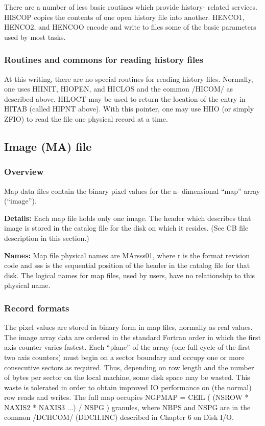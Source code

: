       There are a number of less basic routines which provide history-
related services.  HISCOP copies the contents of one open history file
into another.  HENCO1, HENCO2, and HENCOO encode and write to files
some of the basic parameters used by most tasks.


\subsubsection{Routines and commons for reading history files}


     At this writing, there are no special routines for reading history
files.  Normally, one uses HIINIT, HIOPEN, and HICLOS and the common
/HICOM/ as described above.  HILOCT may be used to return the location
of the entry in HITAB (called HIPNT above).  With this pointer, one may
use HIIO (or simply ZFIO) to read the file one physical record at a
time.

\subsection{Image (MA) file}
\subsubsection{Overview}

 Map data files contain the binary pixel values for the n-
dimensional ``map'' array (``image'').

{\bf Details:} Each map file holds only one image.  The header which
describes that image is stored in the catalog file for the disk on
which it resides.  (See CB file description in this section.)

{\bf Names:} Map file physical names are MArsss01, where r is the
format revision code and sss is the sequential position of the header
in the catalog file for that disk.  The logical names for map files,
used by users, have no relationship to this physical name.


\subsubsection{Record formats}


     The pixel values are stored in binary form in map files, normally
as real values.  The image array data are ordered in the
standard Fortran order in which the first axis counter varies fastest.
Each ``plane'' of the array (one full cycle of the first two axis
counters) must
begin on a sector boundary and occupy one or more consecutive sectors
as required.  Thus, depending on row length and the number of bytes per
sector on the local machine, some disk space may be wasted.  This waste
is tolerated in order to obtain improved IO performance on (the normal)
row reads and writes.  The full map occupies
          NGPMAP = CEIL ( (NSROW * NAXIS2 * NAXIS3 ...) / NSPG )
granules, where NBPS and NSPG are in the common /DCHCOM/ (DDCH.INC)
described in Chapter 6 on Disk I/O.

